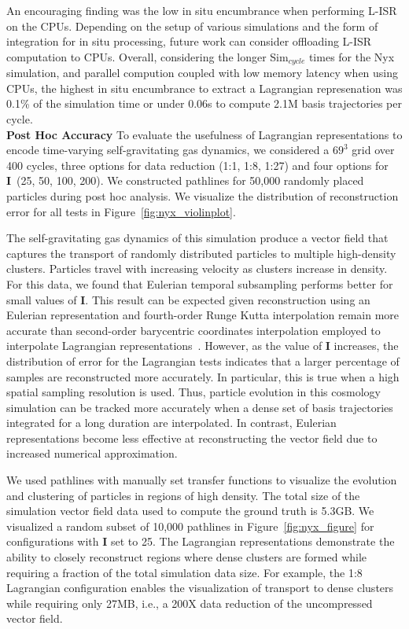 An encouraging finding was the low in situ encumbrance when performing L-ISR on the CPUs.
%
Depending on the setup of various simulations and the form of integration for in situ processing, future work can consider offloading L-ISR computation to CPUs.
%
Overall, considering the longer Sim$_{cycle}$ times for the Nyx simulation, and parallel compution coupled with low memory latency when using CPUs, the highest in situ encumbrance to extract a Lagrangian represenation was 0.1\% of the simulation time or under 0.06s to compute 2.1M basis trajectories per cycle.\\




\noindent\textbf{Post Hoc Accuracy}
To evaluate the usefulness of Lagrangian representations to encode time-varying self-gravitating gas dynamics, we considered a $69^{3}$ grid over 400 cycles, three options for data reduction (1:1, 1:8, 1:27) and four options for \textbf{I}~(25, 50, 100, 200).
%
We constructed pathlines for 50,000 randomly placed particles during post hoc analysis.
%
We visualize the distribution of reconstruction error for all tests in Figure~\ref{fig:nyx_violinplot}.
%

The self-gravitating gas dynamics of this simulation produce a vector field that captures the transport of randomly distributed particles to multiple high-density clusters.
%
Particles travel with increasing velocity as clusters increase in density.
%
For this data, we found that Eulerian temporal subsampling performs better for small values of \textbf{I}.
%
This result can be expected given reconstruction using an Eulerian representation and fourth-order Runge Kutta interpolation remain more accurate than second-order barycentric coordinates interpolation employed to interpolate Lagrangian representations~\cite{bujack2015lagrangian}\cite{hummel2016error}.
%
However, as the value of \textbf{I} increases, the distribution of error for the Lagrangian tests indicates that a larger percentage of samples are reconstructed more accurately.
%
In particular, this is true when a high spatial sampling resolution is used.
%
Thus, particle evolution in this cosmology simulation can be tracked more accurately when a dense set of basis trajectories integrated for a long duration are interpolated.
%
In contrast, Eulerian representations become less effective at reconstructing the vector field due to increased numerical approximation.
%

We used pathlines with manually set transfer functions to visualize the evolution and clustering of particles in regions of high density.
%
The total size of the simulation vector field data used to compute the ground truth is 5.3GB.
%
We visualized a random subset of 10,000 pathlines in Figure~\ref{fig:nyx_figure} for configurations with \textbf{I} set to 25.
%
The Lagrangian representations demonstrate the ability to closely reconstruct regions where dense clusters are formed while requiring a fraction of the total simulation data size.
%
For example, the 1:8 Lagrangian configuration enables the visualization of transport to dense clusters while requiring only 27MB, i.e., a 200X data reduction of the uncompressed vector field.
%

